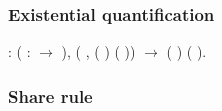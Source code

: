 \documentclass[12pt]{report}
\begin{document}
\subsubsection{Existential quantification}

\begin{coqdoccode}
\coqdocemptyline
\coqdocnoindent
{}  :\coqdoceol
\coqdocindent{1.00em}
\coqdockw{\ensuremath{\forall}}    (  :  \ensuremath{\rightarrow} ),\coqdoceol
\coqdocindent{2.00em}
(\coqdockw{\ensuremath{\forall}} ,    ( )  ( )) \ensuremath{\rightarrow}\coqdoceol
\coqdocindent{1.00em}
   ( )  ( ).\coqdoceol
\coqdocemptyline
\end{coqdoccode}
\subsubsection{Share rule}
\end{document}
